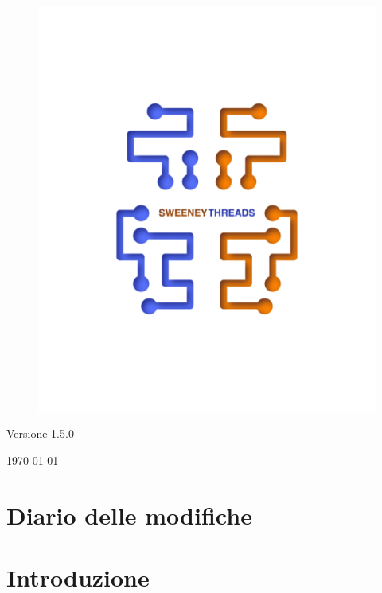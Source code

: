 \documentclass[a4paper]{article}
\begin{document}
\begin{titlepage}
		\begin{figure}[H]
			\centering
			\includegraphics[scale=0.8]{sweeney.png}
		\end{figure}
		\begin{center}
			Versione 1.5.0
		\end{center}
		{\large \today}\\[3cm]
		\vfill
	\end{titlepage}


	\tableofcontents

	\newpage
	\section*{Diario delle modifiche}

	\newpage
	\section{Introduzione}
\end{document}
